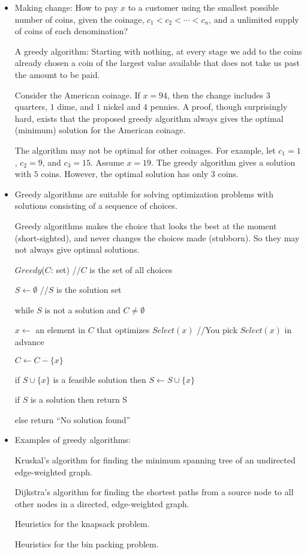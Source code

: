 \documentclass{article}
\begin{document}

\begin{itemize}
\item Making change: How to pay $x$ to a customer using the smallest
possible number of coins, given the coinage, $c_1<c_2<\cdots<c_n$,
and a unlimited supply of coins of each denomination?

A greedy algorithm: Starting with nothing, at every stage we add to
the coins already chosen a coin of the largest value available that does 
not take us past the amount to be paid. 

Consider the American coinage. If $x=94$, then the change includes
$3$ quarters, $1$ dime, and $1$ nickel and $4$ pennies. A proof, though
surprisingly hard, exists that the proposed greedy algorithm always
gives the optimal (minimum) solution for the American coinage.

The algorithm may not be optimal for other coinages. For example,
let $c_1=1$, $c_2=9$, and $c_3=15$. Assume $x=19$. The greedy algorithm
gives a solution with $5$ coins. However, the optimal solution has
only $3$ coins.

\item Greedy algorithms are suitable for solving optimization
problems with solutions consisting of a sequence of choices.

Greedy algorithms makes the choice that looks the best at the
moment (short-sighted), and never changes the choices made
(stubborn). So they may not always give optimal solutions.

$Greedy$($C$: set) //$C$ is the set of all choices
\par\qquad $S\leftarrow\emptyset$ //$S$ is the solution set
\par\qquad while $S$ is not a solution and $C\not=\emptyset$
\par\qquad\qquad $x\leftarrow$ an element in $C$ that optimizes $Select(x)$
//You pick $Select(x)$ in advance
\par\qquad\qquad $C\leftarrow C-\{x\}$
\par\qquad\qquad if $S\cup\{x\}$ is a feasible solution
then $S\leftarrow S\cup\{x\}$
\par\qquad if $S$ is a solution then return S
\par\qquad else return ``No solution found''

\item Examples of greedy algorithms:

Kruskal's algorithm for finding the minimum spanning tree of an
undirected edge-weighted graph.

Dijkstra's algorithm for finding the shortest paths from a source
node to all other nodes in a directed, edge-weighted graph.

Heuristics for the knapsack problem.

Heuristics for the bin packing problem.

\end{itemize}
\end{document}
